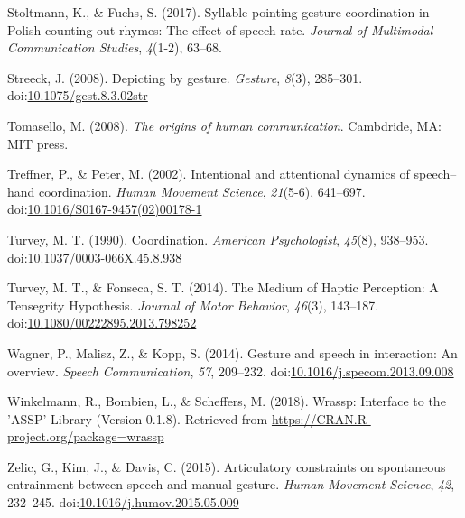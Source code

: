 \documentclass[
  man, noextraspace,floatsintext]{apa6}
\newlength{\cslhangindent}
\newenvironment{cslreferences}%
  {\setlength{\parindent}{0pt}%
  \everypar{\setlength{\hangindent}{\cslhangindent}}\ignorespaces}%
  {\par}
\begin{document}
\begin{cslreferences}
\leavevmode\hypertarget{ref-stoltmannSyllablepointingGestureCoordination2017}{}%
Stoltmann, K., \& Fuchs, S. (2017). Syllable-pointing gesture coordination in Polish counting out rhymes: The effect of speech rate. \emph{Journal of Multimodal Communication Studies}, \emph{4}(1-2), 63--68.

\leavevmode\hypertarget{ref-streeckDepictingGesture2008}{}%
Streeck, J. (2008). Depicting by gesture. \emph{Gesture}, \emph{8}(3), 285--301. doi:\href{https://doi.org/10.1075/gest.8.3.02str}{10.1075/gest.8.3.02str}

\leavevmode\hypertarget{ref-tomaselloOriginsHumanCommunication2008}{}%
Tomasello, M. (2008). \emph{The origins of human communication}. Cambdride, MA: MIT press.

\leavevmode\hypertarget{ref-treffnerIntentionalAttentionalDynamics2002}{}%
Treffner, P., \& Peter, M. (2002). Intentional and attentional dynamics of speech--hand coordination. \emph{Human Movement Science}, \emph{21}(5-6), 641--697. doi:\href{https://doi.org/10.1016/S0167-9457(02)00178-1}{10.1016/S0167-9457(02)00178-1}

\leavevmode\hypertarget{ref-turveyCoordination1990}{}%
Turvey, M. T. (1990). Coordination. \emph{American Psychologist}, \emph{45}(8), 938--953. doi:\href{https://doi.org/10.1037/0003-066X.45.8.938}{10.1037/0003-066X.45.8.938}

\leavevmode\hypertarget{ref-turveyMediumHapticPerception2014}{}%
Turvey, M. T., \& Fonseca, S. T. (2014). The Medium of Haptic Perception: A Tensegrity Hypothesis. \emph{Journal of Motor Behavior}, \emph{46}(3), 143--187. doi:\href{https://doi.org/10.1080/00222895.2013.798252}{10.1080/00222895.2013.798252}

\leavevmode\hypertarget{ref-wagnerGestureSpeechInteraction2014}{}%
Wagner, P., Malisz, Z., \& Kopp, S. (2014). Gesture and speech in interaction: An overview. \emph{Speech Communication}, \emph{57}, 209--232. doi:\href{https://doi.org/10.1016/j.specom.2013.09.008}{10.1016/j.specom.2013.09.008}

\leavevmode\hypertarget{ref-winkelmannWrasspInterfaceASSP2018}{}%
Winkelmann, R., Bombien, L., \& Scheffers, M. (2018). Wrassp: Interface to the 'ASSP' Library (Version 0.1.8). Retrieved from \url{https://CRAN.R-project.org/package=wrassp}

\leavevmode\hypertarget{ref-zelicArticulatoryConstraintsSpontaneous2015}{}%
Zelic, G., Kim, J., \& Davis, C. (2015). Articulatory constraints on spontaneous entrainment between speech and manual gesture. \emph{Human Movement Science}, \emph{42}, 232--245. doi:\href{https://doi.org/10.1016/j.humov.2015.05.009}{10.1016/j.humov.2015.05.009}


\end{cslreferences}
\end{document}
